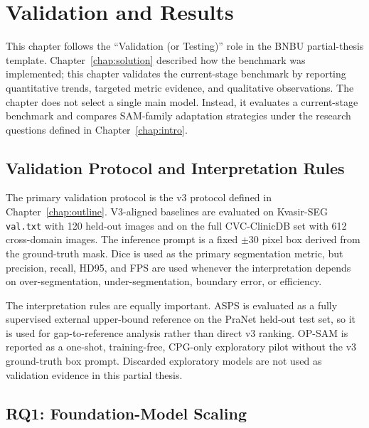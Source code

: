 
\chapter{Validation and Results}
\label{chap:validation}

This chapter follows the ``Validation (or Testing)'' role in the BNBU partial-thesis template. Chapter~\ref{chap:solution} described how the benchmark was implemented; this chapter validates the current-stage benchmark by reporting quantitative trends, targeted metric evidence, and qualitative observations. The chapter does not select a single main model. Instead, it evaluates a current-stage benchmark and compares SAM-family adaptation strategies under the research questions defined in Chapter~\ref{chap:intro}.

\section{Validation Protocol and Interpretation Rules}
\label{sec:validation-protocol}

The primary validation protocol is the v3 protocol defined in Chapter~\ref{chap:outline}. V3-aligned baselines are evaluated on Kvasir-SEG \texttt{val.txt} with 120 held-out images and on the full CVC-ClinicDB set with 612 cross-domain images. The inference prompt is a fixed $\pm30$ pixel box derived from the ground-truth mask. Dice is used as the primary segmentation metric, but precision, recall, HD95, and FPS are used whenever the interpretation depends on over-segmentation, under-segmentation, boundary error, or efficiency.

The interpretation rules are equally important. ASPS is evaluated as a fully supervised external upper-bound reference on the PraNet held-out test set, so it is used for gap-to-reference analysis rather than direct v3 ranking. OP-SAM is reported as a one-shot, training-free, CPG-only exploratory pilot without the v3 ground-truth box prompt. Discarded exploratory models are not used as validation evidence in this partial thesis.

\section{RQ1: Foundation-Model Scaling}
\label{sec:rq1-results}

